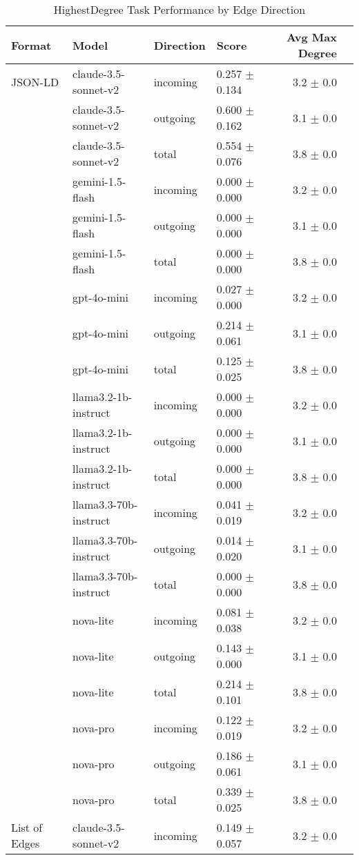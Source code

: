 \begin{table}[ht]
\centering
\caption{HighestDegree Task Performance by Edge Direction}
\begin{tabular}{llllrr}
\toprule
Format & Model & Direction & Score & Avg Max Degree \\
\midrule
JSON-LD & claude-3.5-sonnet-v2 & incoming & 0.257 $\pm$ 0.134 & 3.2 $\pm$ 0.0 \\
 & claude-3.5-sonnet-v2 & outgoing & 0.600 $\pm$ 0.162 & 3.1 $\pm$ 0.0 \\
 & claude-3.5-sonnet-v2 & total & 0.554 $\pm$ 0.076 & 3.8 $\pm$ 0.0 \\
 & gemini-1.5-flash & incoming & 0.000 $\pm$ 0.000 & 3.2 $\pm$ 0.0 \\
 & gemini-1.5-flash & outgoing & 0.000 $\pm$ 0.000 & 3.1 $\pm$ 0.0 \\
 & gemini-1.5-flash & total & 0.000 $\pm$ 0.000 & 3.8 $\pm$ 0.0 \\
 & gpt-4o-mini & incoming & 0.027 $\pm$ 0.000 & 3.2 $\pm$ 0.0 \\
 & gpt-4o-mini & outgoing & 0.214 $\pm$ 0.061 & 3.1 $\pm$ 0.0 \\
 & gpt-4o-mini & total & 0.125 $\pm$ 0.025 & 3.8 $\pm$ 0.0 \\
 & llama3.2-1b-instruct & incoming & 0.000 $\pm$ 0.000 & 3.2 $\pm$ 0.0 \\
 & llama3.2-1b-instruct & outgoing & 0.000 $\pm$ 0.000 & 3.1 $\pm$ 0.0 \\
 & llama3.2-1b-instruct & total & 0.000 $\pm$ 0.000 & 3.8 $\pm$ 0.0 \\
 & llama3.3-70b-instruct & incoming & 0.041 $\pm$ 0.019 & 3.2 $\pm$ 0.0 \\
 & llama3.3-70b-instruct & outgoing & 0.014 $\pm$ 0.020 & 3.1 $\pm$ 0.0 \\
 & llama3.3-70b-instruct & total & 0.000 $\pm$ 0.000 & 3.8 $\pm$ 0.0 \\
 & nova-lite & incoming & 0.081 $\pm$ 0.038 & 3.2 $\pm$ 0.0 \\
 & nova-lite & outgoing & 0.143 $\pm$ 0.000 & 3.1 $\pm$ 0.0 \\
 & nova-lite & total & 0.214 $\pm$ 0.101 & 3.8 $\pm$ 0.0 \\
 & nova-pro & incoming & 0.122 $\pm$ 0.019 & 3.2 $\pm$ 0.0 \\
 & nova-pro & outgoing & 0.186 $\pm$ 0.061 & 3.1 $\pm$ 0.0 \\
 & nova-pro & total & 0.339 $\pm$ 0.025 & 3.8 $\pm$ 0.0 \\
\midrule
List of Edges & claude-3.5-sonnet-v2 & incoming & 0.149 $\pm$ 0.057 & 3.2 $\pm$ 0.0 \\

\end{tabular}
\end{table}
